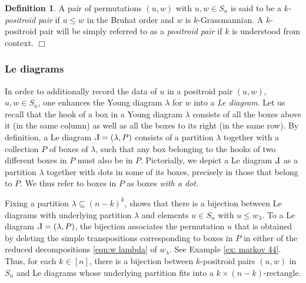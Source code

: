 \documentclass[10pt]{amsart}
\theoremstyle{plain}
\theoremstyle{definition}
\newtheorem{definition}[thm]{Definition}
\theoremstyle{remark}
\numberwithin{equation}{section}
\newcommand{\la}{\lambda}
\newcommand{\MG}[1]{{\color{teal}{{\bf Misha}: #1}}}
\def\Le{\reflectbox{$\mathrm{L}$}}
\begin{document}
\begin{definition}
A pair of permutations $(u, w)$ with $u, w \in S_{n}$ is said to be a \emph{$k$-positroid pair} if $u \leq w$ in the Bruhat order and $w$ is $k$-Grassmannian. A $k$-positroid pair will be simply referred to as a \emph{positroid pair} if $k$ is understood from context.
\hfill$\Box$
\end{definition}

\subsubsection{Le diagrams} In order to additionally record the data of $u$ in a positroid pair $(u, w)$, $u, w \in S_{n}$, one enhances the Young diagram $\la$ for $w$ into a {\it Le diagram}. Let us recall that the hook of a box in a Young diagram $\lambda$ consists of all the boxes above it (in the same column) as well as all the boxes to its right (in the same row). By definition, a Le diagram $\Le = (\lambda, P)$ consists of a partition $\lambda$ together with a collection $P$ of boxes of $\lambda$, such that any box belonging to the hooks of two different boxes in $P$ must also be in $P$. Pictorially, we depict a Le diagram $\Le$ as a partition $\lambda$ together with dots in some of its boxes, precisely in those that belong to $P$. We thus refer to boxes in $P$ as boxes \emph{with a dot}.

Fixing a partition $\la \subseteq (n-k)^{k}$, \cite[Theorem 19.1]{Post} shows that there is a bijection between Le diagrams with underlying partition $\la$ and elements $u \in S_{n}$ with $u \leq w_{\lambda}$. To a Le diagram $\Le = (\lambda, P)$, the bijection associates the permutation $u$ that is obtained by deleting the simple transpositions corresponding to boxes in $P$ in either of the reduced decompositions \eqref{eqn:w lambda} of $w_{\lambda}$. See Example \ref{ex: markov 44}. Thus, for each $k \in [n]$, there is a bijection between $k$-positroid pairs $(u, w)$ in $S_{n}$ and Le diagrams whose underlying partition fits into a $k \times (n-k)$-rectangle.  
\end{document}

